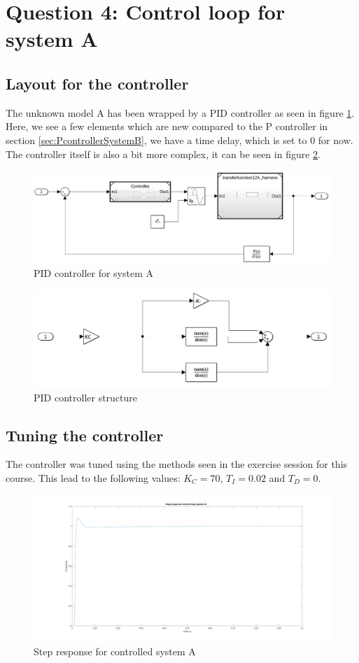 \documentclass[a4paper,kul]{kulakarticle} %
\begin{document}
	\section{Question 4: Control loop for system A}
		\subsection{Layout for the controller}
			\label{sec:PIDcontrollerLayout}
			The unknown model A has been wrapped by a PID controller as seen in figure \ref{fig:PIDcontrolledSystemA}. Here, we see a few elements which are new compared to the P controller in section \ref{sec:PcontrollerSystemB}, we have a time delay, which is set to \num{0} for now. The controller itself is also a bit more complex, it can be seen in figure \ref{fig:PIDcontrollerLayout}. 
			\begin{figure}[h]
				\centering
				\includegraphics[width=0.7\linewidth]{PIDcontrollerSystemA}
				\caption[PID controller system A]{PID controller for system A}
				\label{fig:PIDcontrolledSystemA}
			\end{figure}
			
			\begin{figure}[h]
				\centering
				\includegraphics[width=0.7\linewidth]{PIDcontrollerLayout}
				\caption[PID controller structure]{PID controller structure}
				\label{fig:PIDcontrollerLayout}
			\end{figure}
		\subsection{Tuning the controller}
			The controller was tuned using the methods seen in the exercise session for this course. This lead to the following values: $K_C = 70$, $T_I = 0.02$ and $T_D = 0$. 
			\begin{figure}[h]
				\centering
				\includegraphics[width=0.7\linewidth]{stepControlledSystemA}
				\caption[Step controlled system A]{Step response for controlled system A}
				\label{fig:stepControlledSystemA}
			\end{figure}
			
\end{document}
